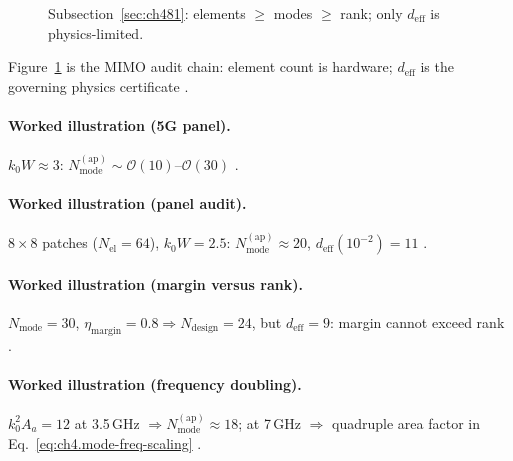 \begin{figure}[t]
\centering
{}
\caption{Subsection~\ref{sec:ch481}: elements \(\ge\) modes \(\ge\) rank; only \(d_{\mathrm{eff}}\) is physics-limited.}
\label{fig:ch4.element-mode-rank}
\end{figure}

Figure~\ref{fig:ch4.element-mode-rank} is the MIMO audit chain: element count is hardware; \(d_{\mathrm{eff}}\) is the governing physics certificate
\cite{collin2001,harrington2001,hansen1988,devaney2004}.

\paragraph{Worked illustration (5G panel).}
\(k_{0}W\approx3\): \(N_{\mathrm{mode}}^{\mathrm{(ap)}}\sim\mathcal{O}(10)\)--\(\mathcal{O}(30)\) \cite{collin2001,harrington2001,hansen1988,jackson1999}.

\paragraph{Worked illustration (panel audit).}
\(8\times8\) patches (\(N_{\mathrm{el}}=64\)), \(k_{0}W=2.5\): \(N_{\mathrm{mode}}^{\mathrm{(ap)}}\approx20\), \(d_{\mathrm{eff}}(10^{-2})=11\)
\cite{collin2001,harrington2001,hansen1988,stratton1941}.

\paragraph{Worked illustration (margin versus rank).}
\(N_{\mathrm{mode}}=30\), \(\eta_{\mathrm{margin}}=0.8\Rightarrow N_{\mathrm{design}}=24\), but \(d_{\mathrm{eff}}=9\): margin cannot exceed rank
\cite{harrington2001,stratton1941,devaney2004}.

\paragraph{Worked illustration (frequency doubling).}
\(k_{0}^{2}A_{a}=12\) at 3.5\,GHz \(\Rightarrow N_{\mathrm{mode}}^{\mathrm{(ap)}}\approx18\); at 7\,GHz \(\Rightarrow\) quadruple area factor in
Eq.~\eqref{eq:ch4.mode-freq-scaling} \cite{jackson1999,hansen1988,collin2001}.

